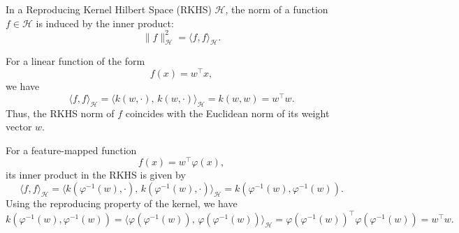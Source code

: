 \documentclass[../main]{subfiles}
\begin{document}
In a Reproducing Kernel Hilbert Space (RKHS) $\mathcal{H}$,  
the norm of a function $f \in \mathcal{H}$ is induced by the inner product:
\begin{equation}
    \|f\|_{\mathcal{H}}^2 = \langle f, f \rangle_{\mathcal{H}}.
\end{equation}

For a linear function of the form
\begin{equation}
    f(x) = w^\top x,
\end{equation}
we have
\begin{equation}
    \langle f, f \rangle_{\mathcal{H}}
    = \langle k(w, \cdot),\, k(w, \cdot) \rangle_{\mathcal{H}}
    = k(w, w)
    = w^\top w.
\end{equation}
Thus, the RKHS norm of $f$ coincides with the Euclidean norm of its weight vector $w$.

For a feature-mapped function
\begin{equation}
    f(x) = w^\top \varphi(x),
\end{equation}
its inner product in the RKHS is given by
\begin{equation}
    \langle f, f \rangle_{\mathcal{H}}
    = \langle k(\varphi^{-1}(w), \cdot),\, k(\varphi^{-1}(w), \cdot) \rangle_{\mathcal{H}}
    = k(\varphi^{-1}(w), \varphi^{-1}(w)).
\end{equation}
Using the reproducing property of the kernel, we have
\begin{equation}
    k(\varphi^{-1}(w), \varphi^{-1}(w))
    = \langle \varphi(\varphi^{-1}(w)),\, \varphi(\varphi^{-1}(w)) \rangle_{\mathcal{H}}
    = \varphi(\varphi^{-1}(w))^\top \varphi(\varphi^{-1}(w))
    = w^\top w.
\end{equation}
\end{document}
